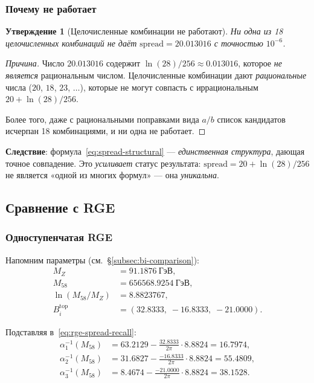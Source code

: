 \documentclass[11pt,a4paper]{article}
\newtheorem{proposition}[theorem]{Утверждение}
\theoremstyle{definition}
\begin{document}
\subsubsection{Почему не работает}

\begin{proposition}[Целочисленные комбинации не работают]
\label{prop:integer-fails}
Ни одна из 18 целочисленных комбинаций не даёт
$\text{spread} = 20.013016$ с точностью $10^{-6}$.
\end{proposition}

\begin{proof}[Причина]
Число $20.013016$ содержит $\ln(28)/256 \approx 0.013016$,
которое \emph{не является} рациональным числом. Целочисленные
комбинации дают \emph{рациональные} числа ($20$, $18$, $23$,
$\ldots$), которые не могут совпасть с иррациональным
$20 + \ln(28)/256$.

Более того, даже с рациональными поправками вида $a/b$
список кандидатов исчерпан 18 комбинациями, и ни одна не работает.
\end{proof}

\medskip\noindent
\textbf{Следствие}: формула~\eqref{eq:spread-structural}
--- \emph{единственная структура}, дающая точное совпадение.
Это \emph{усиливает} статус результата: $\text{spread} = 20 + \ln(28)/256$
не является «одной из многих формул» --- она \emph{уникальна}.

\subsection{Сравнение с RGE}
\label{subsec:spread-rge}

\subsubsection{Одноступенчатая RGE}

Напомним параметры (см.~\S\ref{subsec:bi-comparison}):
\begin{align}
    M_Z &= 91.1876~\text{ГэВ}, \\
    M_{58} &= 656568.9254~\text{ГэВ}, \\
    \ln(M_{58}/M_Z) &= 8.8823767, \\
    B_i^{\text{top}} &= (32.8333,\; -16.8333,\; -21.0000).
\end{align}

\medskip\noindent
Подставляя в~\eqref{eq:rge-spread-recall}:
\begin{align}
    \alpha_1^{-1}(M_{58}) &= 63.2129 - \frac{32.8333}{2\pi} \cdot 8.8824
    = 16.7974, \\
    \alpha_2^{-1}(M_{58}) &= 31.6827 - \frac{-16.8333}{2\pi} \cdot 8.8824
    = 55.4809, \\
    \alpha_3^{-1}(M_{58}) &= 8.4674 - \frac{-21.0000}{2\pi} \cdot 8.8824
    = 38.1528.
\end{align}
\end{document}
